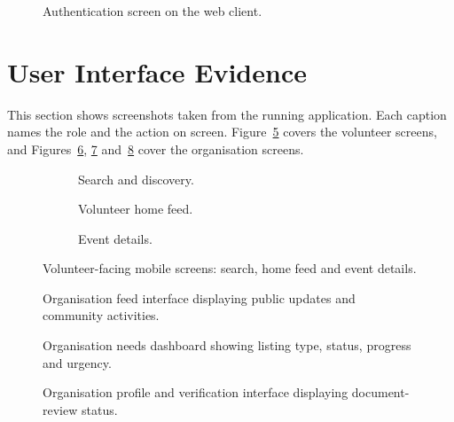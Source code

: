 \begin{figure}[H]
    \centering
    \caption{Authentication screen on the web client.}
    \label{fig:navigation}
\end{figure}

\section{User Interface Evidence}
\label{sec:impl-ui}
This section shows screenshots taken from the running application. Each caption names the role and the action on screen. Figure~\ref{fig:ui-volunteer} covers the volunteer screens, and Figures~\ref{fig:organisation-feed}, \ref{fig:needs-management} and~\ref{fig:org-verification} cover the organisation screens.

\begin{figure}[H]
\centering
\begin{subfigure}[t]{0.31\textwidth}
  \centering
  \caption{Search and discovery.}
  \label{fig:search-discovery}
\end{subfigure}\hfill
\begin{subfigure}[t]{0.31\textwidth}
  \centering
  \caption{Volunteer home feed.}
  \label{fig:volunteer-home}
\end{subfigure}\hfill
\begin{subfigure}[t]{0.31\textwidth}
  \centering
  \caption{Event details.}
  \label{fig:event-details}
\end{subfigure}
\caption{Volunteer-facing mobile screens: search, home feed and event details.}
\label{fig:ui-volunteer}
\end{figure}

\begin{figure}[H]
\centering
{}
\caption{Organisation feed interface displaying public updates and community activities.}
\label{fig:organisation-feed}
\end{figure}

\begin{figure}[H]
\centering
{}
\caption{Organisation needs dashboard showing listing type, status, progress and urgency.}
\label{fig:needs-management}
\end{figure}

\begin{figure}[H]
\centering
{}
\caption{Organisation profile and verification interface displaying document-review status.}
\label{fig:org-verification}
\end{figure}

